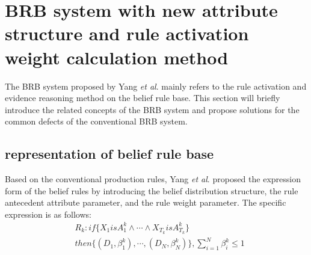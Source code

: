 \documentclass{ieeeaccess}
\begin{document}
\section{BRB system with new attribute structure and rule activation weight calculation method}
The BRB system proposed by Yang \textit{et al}.\cite{a1} mainly refers to the rule activation and evidence reasoning method on the belief rule base.
This section will briefly introduce the related concepts of the BRB system and propose solutions for the common defects of the conventional BRB system.
\subsection{representation of belief rule base}
Based on the conventional production rules, Yang \textit{et al}.\cite{a1} proposed the expression form of the belief rules by introducing the belief distribution structure,
the rule antecedent attribute parameter, and the rule weight parameter. The specific expression is as follows:
\begin{equation}
    \begin{split}
        &R_k:if\{X_1isA_1^k \wedge \cdots \wedge X_{T_k}isA_{T_k}^k\} \\
        &then\{(D_1,\beta_1^k),\cdots,(D_N,\beta_N^k)\},\sum_{i=1}^N\beta_i^k\leq1
    \end{split}
\end{equation}
\end{document}
